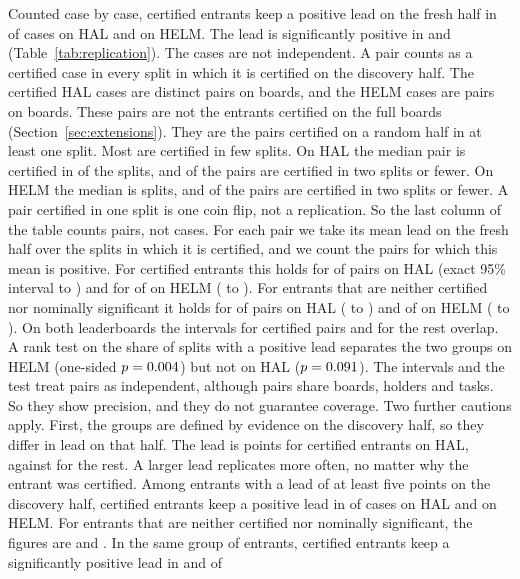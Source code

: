 \documentclass[11pt]{article}
\begin{document}
Counted case by case, certified entrants keep a positive lead on the fresh half in \NumReplHalCertPos{} of cases on HAL and \NumReplHelmCertPos{} on HELM. The lead is significantly positive in \NumReplHalCertSig{} and \NumReplHelmCertSig{} (Table~\ref{tab:replication}). The cases are not independent. A pair counts as a certified case in every split in which it is certified on the discovery half. The \NumReplHalCertN{} certified HAL cases are \NumReplHalCertPairs{} distinct pairs on \NumReplHalCertPairBoards{} boards, and the \NumReplHelmCertN{} HELM cases are \NumReplHelmCertPairs{} pairs on \NumReplHelmCertPairBoards{} boards. These pairs are not the entrants certified on the full boards (Section~\ref{sec:extensions}). They are the pairs certified on a random half in at least one split. Most are certified in few splits. On HAL the median pair is certified in \NumReplHalCertSplitsMedian{} of the \NumReplHalR{} splits, and \NumReplHalCertPairsFewSplits{} of the \NumReplHalCertPairs{} pairs are certified in two splits or fewer. On HELM the median is \NumReplHelmCertSplitsMedian{} splits, and \NumReplHelmCertPairsFewSplits{} of the \NumReplHelmCertPairs{} pairs are certified in two splits or fewer. A pair certified in one split is one coin flip, not a replication. So the last column of the table counts pairs, not cases. For each pair we take its mean lead on the fresh half over the splits in which it is certified, and we count the pairs for which this mean is positive. For certified entrants this holds for \NumReplHalCertPairsLeadPos{} of \NumReplHalCertPairs{} pairs on HAL (exact 95\% interval \NumReplHalCertPairCpLo{} to \NumReplHalCertPairCpHi{}) and for \NumReplHelmCertPairsLeadPos{} of \NumReplHelmCertPairs{} on HELM (\NumReplHelmCertPairCpLo{} to \NumReplHelmCertPairCpHi{}). For entrants that are neither certified nor nominally significant it holds for \NumReplHalOthPairsLeadPos{} of \NumReplHalOthPairs{} pairs on HAL (\NumReplHalOthPairCpLo{} to \NumReplHalOthPairCpHi{}) and \NumReplHelmOthPairsLeadPos{} of \NumReplHelmOthPairs{} on HELM (\NumReplHelmOthPairCpLo{} to \NumReplHelmOthPairCpHi{}). On both leaderboards the intervals for certified pairs and for the rest overlap. A rank test on the share of splits with a positive lead separates the two groups on HELM (one-sided $p=0.004{}$) but not on HAL ($p=0.091{}$). The intervals and the test treat pairs as independent, although pairs share boards, holders and tasks. So they show precision, and they do not guarantee coverage. Two further cautions apply. First, the groups are defined by evidence on the discovery half, so they differ in lead on that half. The lead is \NumReplHalCertLeadD{} points for certified entrants on HAL, against \NumReplHalOthLeadD{} for the rest. A larger lead replicates more often, no matter why the entrant was certified. Among entrants with a lead of at least five points on the discovery half, certified entrants keep a positive lead in \NumReplHalLLCertPos{} of cases on HAL and \NumReplHelmLLCertPos{} on HELM. For entrants that are neither certified nor nominally significant, the figures are \NumReplHalLLOthPos{} and \NumReplHelmLLOthPos{}. In the same group of entrants, certified entrants keep a significantly positive lead in \NumReplHalLLCertSig{} and \NumReplHelmLLCertSig{} of 
\end{document}
